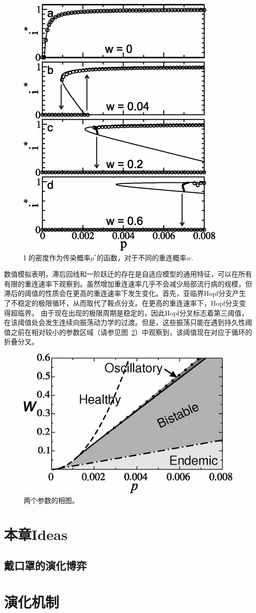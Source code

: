 \begin{figure}
    \centering
    \includegraphics[width = 0.5\linewidth]{Pics/bifurcation_diagram.png}
    \caption{I 的密度作为传染概率$p^*$的函数，对于不同的重连概率$w$.}
    \label{fig:bifurcation_diagram}
\end{figure}

数值模拟表明，滞后回线和一阶跃迁的存在是自适应模型的通用特征，可以在所有有限的重连速率下观察到。虽然增加重连速率几乎不会减少局部流行病的规模，但滞后的阈值的性质会在更高的重连速率下发生变化。首先，亚临界Hopf分支产生了不稳定的极限循环，从而取代了鞍点分支。在更高的重连速率下，Hopf分支变得超临界。 由于现在出现的极限周期是稳定的，因此Hopf分叉标志着第三阈值，在该阈值处会发生连续向振荡动力学的过渡。但是，这些振荡只能在遇到持久性阈值之前在相对较小的参数区域（请参见图~\ref{fig:2-para-phase}）中观察到，该阈值现在对应于循环的折叠分叉。

\begin{figure}
    \centering
    \includegraphics[width = 0.5\linewidth]{Pics/2-para-bifurcation.png}
    \caption{两个参数的相图。}
    \label{fig:2-para-phase}
\end{figure}

\section{本章Ideas}

\subsection{戴口罩的演化博弈}

\section*{演化机制}